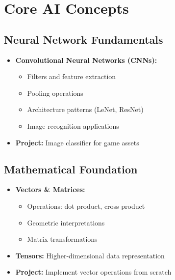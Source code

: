 \documentclass{article}
\begin{document}
\section{Core AI Concepts}

\subsection{Neural Network Fundamentals}
\begin{itemize}
\item \textbf{Convolutional Neural Networks (CNNs):}
    \begin{itemize}
    \item Filters and feature extraction
    \item Pooling operations
    \item Architecture patterns (LeNet, ResNet)
    \item Image recognition applications
    \end{itemize}
    
\item \textbf{Project:} Image classifier for game assets
\end{itemize}

\subsection{Mathematical Foundation}
\begin{itemize}
\item \textbf{Vectors \& Matrices:}
    \begin{itemize}
    \item Operations: dot product, cross product
    \item Geometric interpretations
    \item Matrix transformations
    \end{itemize}
    
\item \textbf{Tensors:} Higher-dimensional data representation
\item \textbf{Project:} Implement vector operations from scratch
\end{itemize}
\end{document}
